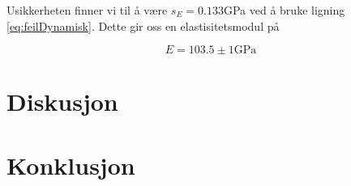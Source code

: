 \documentclass[a4paper,11pt, twocolumn]{article}
\begin{document}
Usikkerheten finner vi til å være $s_E = 0.133$GPa ved å bruke ligning \ref{eq:feilDynamisk}. Dette gir oss en elastisitetsmodul på

\begin{equation}
	E = 103.5\pm1\text{GPa}
\end{equation}

\section{Diskusjon}


\section{Konklusjon}

\printbibliography
\clearpage
\onecolumn
\appendix


\end{document}
